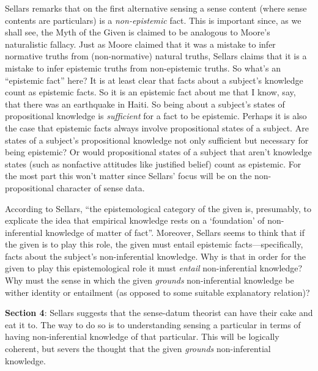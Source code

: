 \documentclass[11pt]{article}
\begin{document}
Sellars remarks that on the first alternative sensing a sense content (where sense contents are particulars) is a \emph{non-epistemic} fact. This is important since, as we shall see, the Myth of the Given is claimed to be analogous to Moore's naturalistic fallacy. Just as Moore claimed that it was a mistake to infer normative truths from (non-normative) natural truths, Sellars claims that it is a mistake to infer epistemic truths from non-epistemic truths. So what's an ``epistemic fact'' here? It is at least clear that facts about a subject's knowledge count as epistemic facts. So it is an epistemic fact about me that I know, say, that there was an earthquake in Haiti. So being about a subject's states of propositional knowledge is \emph{sufficient} for a fact to be epistemic. Perhaps it is also the case that epistemic facts always involve propositional states of a subject. Are states of a subject's propositional knowledge not only sufficient but necessary for being epistemic? Or would propositional states of a subject that aren't knowledge states (such as nonfactive attitudes like justified belief) count as epistemic. For the most part this won't matter since Sellars' focus will be on the non-propositional character of sense data.

According to Sellars, ``the epistemological category of the given is, presumably, to explicate the idea that empirical knowledge rests on a `foundation' of non-inferential knowledge of matter of fact''. Moreover, Sellars seems to think that if the given is to play this role, the given must entail epistemic facts---specifically, facts about the subject's non-inferential knowledge. Why is that in order for the given to play this epistemological role it must \emph{entail} non-inferential knowledge? Why must the sense in which the given \emph{grounds} non-inferential knowledge be wither identity or entailment (as opposed to some suitable explanatory relation)?

\textbf{Section 4}: Sellars suggests that the sense-datum theorist can have their cake and eat it to. The way to do so is to understanding sensing a particular in terms of having non-inferential knowledge of that particular. This will be logically coherent, but severs the thought that the given \emph{grounds} non-inferential knowledge.

\end{document}
